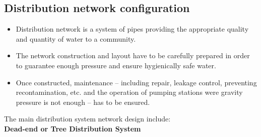 \subsection{Distribution network configuration} 
\begin{itemize}
\item Distribution network is a system of pipes providing the appropriate quality and quantity of water to a community. 
\item The network construction and layout have to be carefully prepared in order to guarantee enough pressure and ensure hygienically safe water. 
\item Once constructed, maintenance – including repair, leakage control, preventing recontamination, etc. and the operation of pumping stations were gravity pressure is not enough – has to be ensured.
\end{itemize}

The main distribution system network design include:\\
\vspace{1cm}
    \textbf{Dead-end or Tree Distribution System}\\

